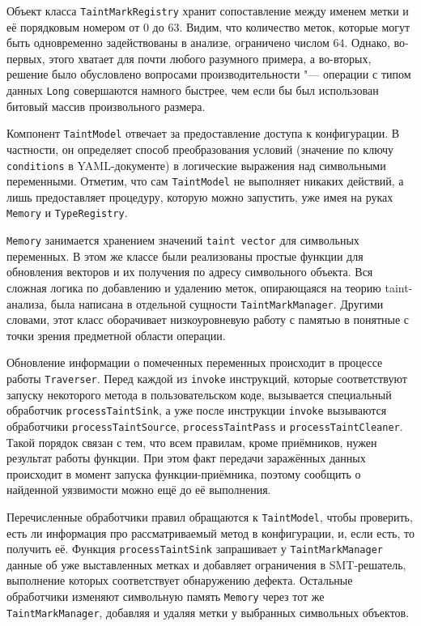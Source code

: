 Объект класса \verb|TaintMarkRegistry| хранит сопоставление между именем метки и её порядковым номером от $0$ до $63$. Видим, что количество меток, которые могут быть одновременно задействованы в анализе, ограничено числом $64$. Однако, во-первых, этого хватает для почти любого разумного примера, а во-вторых, решение было обусловлено вопросами производительности "--- операции с типом данных \verb|Long| совершаются намного быстрее, чем если бы был использован битовый массив произвольного размера. 

Компонент \verb|TaintModel| отвечает за предоставление доступа к конфигурации. В частности, он определяет способ преобразования условий (значение по ключу \verb|conditions| в YAML-документе) в логические выражения над символьными переменными. Отметим, что сам \verb|TaintModel| не выполняет никаких действий, а лишь предоставляет процедуру, которую можно запустить, уже имея на руках \verb|Memory| и \verb|TypeRegistry|.

\verb|Memory| занимается хранением значений \verb|taint vector| для символьных переменных. В этом же классе были реализованы простые функции для обновления векторов и их получения по адресу символьного объекта. Вся сложная логика по добавлению и удалению меток, опирающаяся на теорию taint-анализа, была написана в отдельной сущности \verb|TaintMarkManager|. Другими словами, этот класс оборачивает низкоуровневую работу с памятью в понятные с точки зрения предметной области операции.

Обновление информации о помеченных переменных происходит в процессе работы \verb|Traverser|. Перед каждой из \verb|invoke| инструкций, которые соответствуют запуску некоторого метода в пользовательском коде, вызывается специальный обработчик \verb|processTaintSink|, а уже после инструкции \verb|invoke| вызываются обработчики \verb|processTaintSource|, \verb|processTaintPass| и \verb|processTaintCleaner|. Такой порядок связан с тем, что всем правилам, кроме приёмников, нужен результат работы функции. При этом факт передачи заражённых данных происходит в момент запуска функции-приёмника, поэтому сообщить о найденной уязвимости можно ещё до её выполнения. 

Перечисленные обработчики правил обращаются к \verb|TaintModel|, чтобы проверить, есть ли информация про рассматриваемый метод в конфигурации, и, если есть, то получить её. Функция \verb|processTaintSink| запрашивает у \verb|TaintMarkManager| данные об уже выставленных метках и добавляет ограничения в SMT-решатель, выполнение которых соответствует обнаружению дефекта. Остальные обработчики изменяют символьную память \verb|Memory| через тот же \verb|TaintMarkManager|, добавляя и удаляя метки у выбранных символьных объектов.


